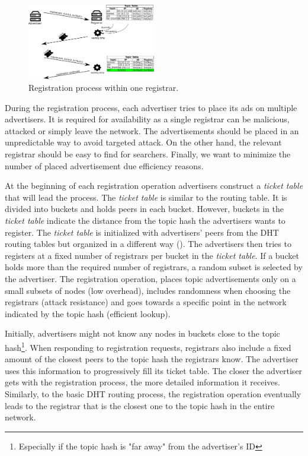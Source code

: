 \begin{figure}
    \includegraphics[width=0.5\textwidth]{img/registration}
    \caption{Registration process within one registrar.}
    \label{fig:registration}
\end{figure}




During the registration process, each advertiser tries to place its ads on multiple advertisers. It is required for availability as a single registrar can be malicious, attacked or simply leave the network. The advertisements should be placed in an unpredictable way to avoid targeted attack. On the other hand, the relevant registrar should be easy to find for searchers. Finally, we want to minimize the number of placed advertisement due efficiency reasons. 

At the beginning of each registration operation advertisers construct a \emph{ticket table} that will lead the process. The \emph{ticket table} is similar to the routing table. It is divided into buckets and holds peers in each bucket. However, buckets in the \emph{ticket table} indicate the distance from the topic hash the advertisers wants to register. The \emph{ticket table} is initialized with advertisers' peers from the DHT routing tables but organized in a different way (). The advertisers then tries to registers at a fixed number of registrars per bucket in the \emph{ticket table}. If a bucket holds more than the required number of registrars, a random subset is selected by the advertiser. The registration operation, places topic advertisements only on a small subsets of nodes (low overhead), includes randomness when choosing the registrars (attack resistance) and goes towards a specific point in the network indicated by the topic hash (efficient lookup).

Initially, advertisers might not know any nodes in buckets close to the topic hash\footnote{Especially if the topic hash is "far away" from the advertiser's ID}. When responding to registration requests, registrars also include a fixed amount of the closest peers to the topic hash the registrars know. The advertiser uses this information to progressively fill its ticket table. The closer the advertiser gets with the registration process, the more detailed information it receives. Similarly, to the basic DHT routing process, the registration operation eventually leads to the registrar that is the closest one to the topic hash in the entire network. 

